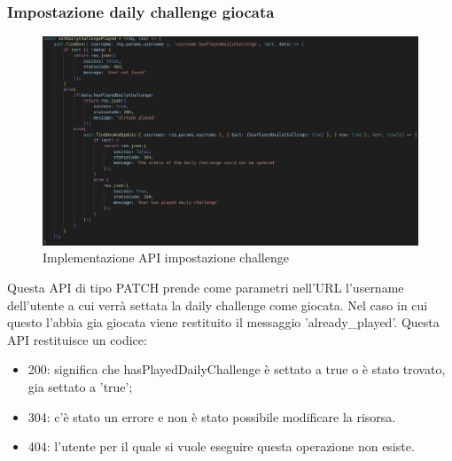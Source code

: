 \subsubsection{Impostazione daily challenge giocata}
\begin{figure}[!h]
\centering
\includegraphics[scale=0.4]{images/api_set_daily_challenge.jpg}
\caption{Implementazione API impostazione challenge}
\label{fig:api_set_daily_challenge}
\end{figure}
\noindent
Questa API di tipo PATCH prende come parametri nell'URL l'username dell'utente a cui verrà settata la daily challenge come giocata. Nel caso in cui questo l'abbia gia giocata viene restituito il messaggio 'already\_played'.
Questa API restituisce un codice:
\begin{itemize}
    \item 200: significa che hasPlayedDailyChallenge è settato a true o è stato trovato, gia settato a 'true';
    \item 304: c'è stato un errore e non è stato possibile modificare la risorsa.
    \item 404: l'utente per il quale si vuole eseguire questa operazione non esiste.
\end{itemize}

\newpage
